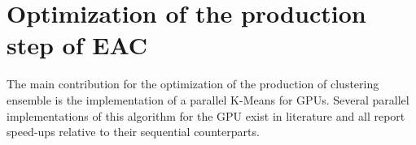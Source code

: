 

\section{Optimization of the production step of EAC}
\label{sec:production}

The main contribution for the optimization of the production of clustering ensemble is the implementation of a parallel K-Means for GPUs.
Several parallel implementations of this algorithm for the GPU exist in literature \cite{Bai2009, Zechner2009, Sirotkovi2012} and all report speed-ups relative to their sequential counterparts.

